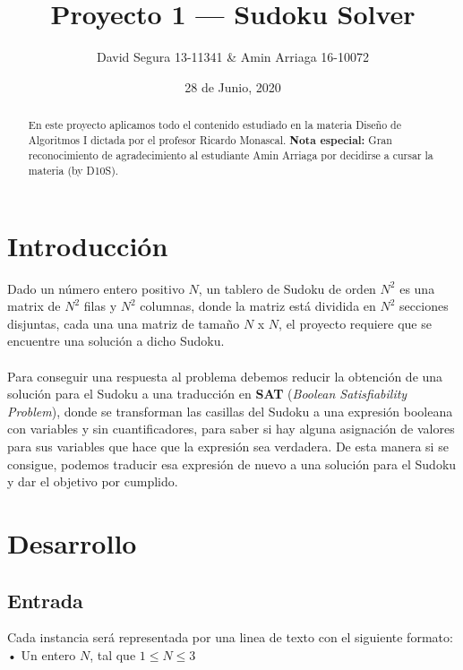 \documentclass[letterpaper,12pt]{article}
\begin{document}
\title{Proyecto 1 --- Sudoku Solver}
\author{David Segura 13-11341 \& Amin Arriaga 16-10072}
\date{28 de Junio, 2020}
\maketitle

\begin{abstract}
En este proyecto aplicamos todo el contenido estudiado en la materia Diseño de Algoritmos I dictada por el profesor Ricardo Monascal. \textbf{Nota especial:} Gran reconocimiento de agradecimiento al estudiante Amin Arriaga por decidirse a cursar la materia (by D10S).
\end{abstract}


\section{Introducción}

Dado un número entero positivo $N$, un tablero de Sudoku de orden $N^2$ es una matrix de $N^2$ filas y
$N^2$ columnas, donde la matriz está dividida en $N^2$ secciones disjuntas, cada una una matriz de tamaño $N$ x $N$, el proyecto requiere que se encuentre una solución a dicho Sudoku.\\
\\
Para conseguir una respuesta al problema debemos reducir la obtención de una solución para el Sudoku a una traducción en \textbf{SAT} (\textit{Boolean Satisfiability Problem}), donde se transforman las casillas del Sudoku a una expresión booleana con variables y sin cuantificadores, para saber si hay alguna asignación de valores para sus variables que hace que la expresión sea verdadera. De esta manera si se consigue, podemos traducir esa expresión de nuevo a una solución para el Sudoku y dar el objetivo por cumplido.

\section{Desarrollo}

\subsection{Entrada}
Cada instancia será representada por una linea de texto con el siguiente formato: \\

• Un entero $N$, tal que $1 \leq N \leq 3$\\
\end{document}
